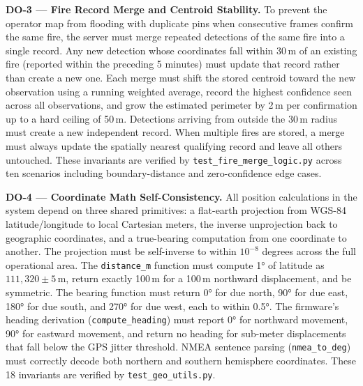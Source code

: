 \documentclass[journal, onecolumn]{IEEEtran}
\begin{document}
\vspace{0.75em}

\textbf{DO-3 — Fire Record Merge and Centroid Stability.}
To prevent the operator map from flooding with duplicate pins when consecutive frames confirm the same fire, the server must merge repeated detections of the same fire into a single record. Any new detection whose coordinates fall within 30\,m of an existing fire (reported within the preceding 5 minutes) must update that record rather than create a new one. Each merge must shift the stored centroid toward the new observation using a running weighted average, record the highest confidence seen across all observations, and grow the estimated perimeter by 2\,m per confirmation up to a hard ceiling of 50\,m. Detections arriving from outside the 30\,m radius must create a new independent record. When multiple fires are stored, a merge must always update the spatially nearest qualifying record and leave all others untouched. These invariants are verified by \texttt{test\_fire\_merge\_logic.py} across ten scenarios including boundary-distance and zero-confidence edge cases.

\vspace{0.75em}

\textbf{DO-4 — Coordinate Math Self-Consistency.}
All position calculations in the system depend on three shared primitives: a flat-earth projection from WGS-84 latitude/longitude to local Cartesian meters, the inverse unprojection back to geographic coordinates, and a true-bearing computation from one coordinate to another. The projection must be self-inverse to within $10^{-8}$ degrees across the full operational area. The \texttt{distance\_m} function must compute 1° of latitude as $111{,}320 \pm 5$\,m, return exactly 100\,m for a 100\,m northward displacement, and be symmetric. The bearing function must return 0° for due north, 90° for due east, 180° for due south, and 270° for due west, each to within 0.5°. The firmware's heading derivation (\texttt{compute\_heading}) must report 0° for northward movement, 90° for eastward movement, and return no heading for sub-meter displacements that fall below the GPS jitter threshold. NMEA sentence parsing (\texttt{nmea\_to\_deg}) must correctly decode both northern and southern hemisphere coordinates. These 18 invariants are verified by \texttt{test\_geo\_utils.py}.

\vspace{0.75em}
\end{document}
